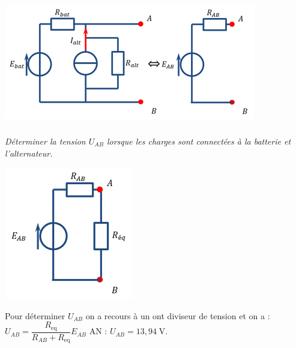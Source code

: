 \documentclass[10pt,fleqn]{book} %
\begin{document}
\begin{multicols}{2}
\begin{corrige}
\begin{center}
\includegraphics[width=.9\linewidth]{images/cor_04}
\end{center}
\end{corrige}
\else
\fi


\subparagraph{}
\textit{Déterminer la tension $U_{AB}$ lorsque les charges sont connectées à la batterie et l’alternateur.}
\ifprof

\begin{center}
\includegraphics[width=.45\linewidth]{images/cor_05}
\end{center}

\begin{corrige}
Pour déterminer $U_{AB}$ on a recours à un ont diviseur de tension et on a :
$U_{AB}=\dfrac{R_\text{eq}}{R_{AB}+R_\text{eq} } E_{AB}$
AN : $U_{AB}=13,94 \; \text{V}$.

\end{corrige}
\else
\fi

\end{multicols}
\end{document}
